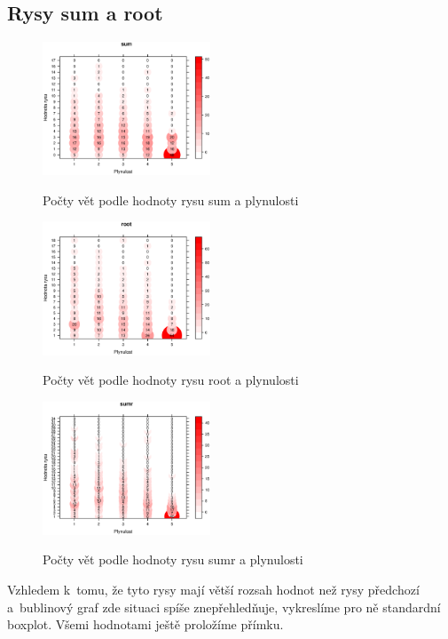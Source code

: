 \documentclass[12pt,a4paper]{report}
\begin{document}
\subsection{Rysy sum a root}
\begin{figure}[!htb]
\begin{center}
  \centering\includegraphics[width=50mm]{./grafy/rysy/sum-c.eps}
  \caption{Počty vět podle hodnoty rysu sum a plynulosti}\label{gr:sumc}
\endminipage\quad
{}
  \centering\includegraphics[width=50mm]{./grafy/rysy/root-c.eps}
  \caption{Počty vět podle hodnoty rysu root a plynulosti}\label{gr:rootc}
\endminipage\quad
{}
  \centering\includegraphics[width=50mm]{./grafy/rysy/sumr-c.eps}
  \caption{Počty vět podle hodnoty rysu sumr a plynulosti}\label{gr:sumrc}
\endminipage
\end{center}
\end{figure}

Vzhledem k~tomu, že tyto rysy mají větší rozsah hodnot než rysy předchozí a~bublinový graf zde situaci spíše znepřehledňuje, vykreslíme pro ně standardní box\-plot. Všemi hodnotami ještě proložíme přímku.
\end{document}
